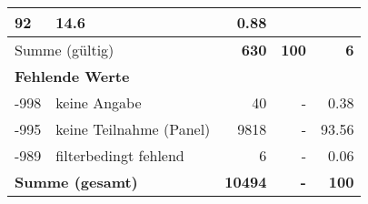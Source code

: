 \begin{longtable}{lXrrr}
       \num{92} &
       \num[round-mode=places,round-precision=2]{14.6} &
         \num[round-mode=places,round-precision=2]{0.88} \\
     \midrule
     \multicolumn{2}{l}{Summe (gültig)} &
       \textbf{\num{630}} &
     \textbf{\num{100}} &
       \textbf{\num[round-mode=places,round-precision=2]{6}} \\
     \multicolumn{5}{l}{\textbf{Fehlende Werte}}\\
       -998 &
       keine Angabe &
         \num{40} &
        - &
         \num[round-mode=places,round-precision=2]{0.38} \\
       -995 &
       keine Teilnahme (Panel) &
         \num{9818} &
        - &
         \num[round-mode=places,round-precision=2]{93.56} \\
       -989 &
       filterbedingt fehlend &
         \num{6} &
        - &
         \num[round-mode=places,round-precision=2]{0.06} \\
     \midrule
     \multicolumn{2}{l}{\textbf{Summe (gesamt)}} &
          \textbf{\num{10494}} &
        \textbf{-} &
        \textbf{\num{100}} \\
     \bottomrule
     \end{longtable}
     
